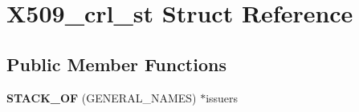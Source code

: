 \hypertarget{struct_x509__crl__st}{}\section{X509\+\_\+crl\+\_\+st Struct Reference}
\label{struct_x509__crl__st}
\subsection*{Public Member Functions}
\begin{DoxyCompactItemize}
\item 
\mbox{\label{struct_x509__crl__st_af37f4e1a53865648212087fd65206bb6}} 
{\bfseries S\+T\+A\+C\+K\+\_\+\+OF} (G\+E\+N\+E\+R\+A\+L\+\_\+\+N\+A\+M\+ES) $\ast$issuers
\end{DoxyCompactItemize}
